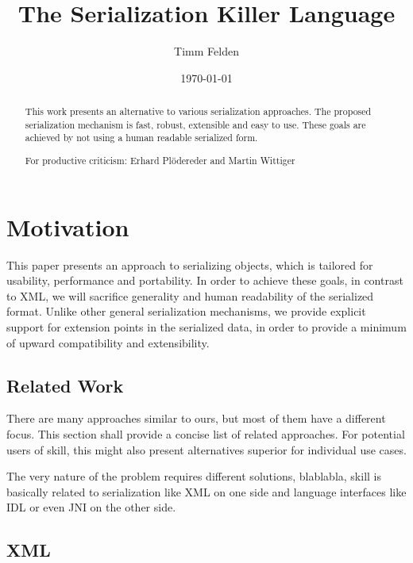 \documentclass[a4paper,10pt]{article}
\title{The Serialization Killer Language}
\author{Timm Felden}
\date{\today}
\begin{document}
\maketitle

\begin{abstract}
 This work presents an alternative to various serialization approaches. The proposed serialization mechanism is fast, robust, extensible and easy to use. These goals are achieved by not using a human readable serialized form. 
\end{abstract}


\renewcommand{\abstractname}{Acknowledgements}
\begin{abstract}
For productive criticism: Erhard Plödereder and Martin Wittiger 
\end{abstract}


\section{Motivation}

This paper presents an approach to serializing objects, which is tailored for usability, performance and portability. In order to achieve these goals, in contrast to XML, we will sacrifice generality and human readability of the serialized format. Unlike other general serialization mechanisms, we provide explicit support for extension points in the serialized data, in order to provide a minimum of upward compatibility and extensibility.

\subsection{Related Work}

There are many approaches similar to ours, but most of them have a different focus. This section shall provide a concise list of related approaches. For potential users of skill, this might also present alternatives superior for individual use cases.

The very nature of the problem requires different solutions, blablabla, skill is basically related to serialization like XML on one side and language interfaces like IDL or even JNI on the other side.

\subsection*{XML}
\end{document}
